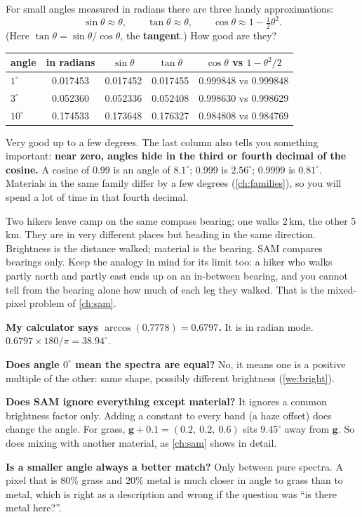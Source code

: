 \documentclass[11pt,a4paper,oneside,openany]{book}
\newcommand{\B}[1]{{\symbf{#1}}}
\newcommand{\B}[1]{{\bm{#1}}}
\newcommand{\vg}{\B{g}}
\begin{document}
For small angles measured in radians there are three handy approximations:
\[
  \sin\theta\approx\theta,\qquad \tan\theta\approx\theta,\qquad \cos\theta\approx1-\tfrac12\theta^2 .
\]
(Here $\tan\theta=\sin\theta/\cos\theta$, the \textbf{tangent}.) How good are they?

\begin{center}
\begin{tabular}{@{}lcccc@{}}
\toprule
angle & in radians & $\sin\theta$ & $\tan\theta$ & $\cos\theta$ vs $1-\theta^2/2$\\
\midrule
$1^\circ$ & 0.017453 & 0.017452 & 0.017455 & 0.999848 vs 0.999848\\
$3^\circ$ & 0.052360 & 0.052336 & 0.052408 & 0.998630 vs 0.998629\\
$10^\circ$ & 0.174533 & 0.173648 & 0.176327 & 0.984808 vs 0.984769\\
\bottomrule
\end{tabular}
\end{center}

Very good up to a few degrees. The last column also tells you something important: \textbf{near zero, angles hide in the
third or fourth decimal of the cosine.} A cosine of 0.99 is an angle of $8.1^\circ$; 0.999 is $2.56^\circ$; 0.9999 is
$0.81^\circ$. Materials in the same family differ by a few degrees (\cref{ch:families}), so you will spend a lot of time
in that fourth decimal.

\begin{analogy}
Two hikers leave camp on the same compass bearing; one walks 2\,km, the other 5\,km. They are in very different places
but heading in the same direction. Brightness is the distance walked; material is the bearing. SAM compares bearings
only. Keep the analogy in mind for its limit too: a hiker who walks partly north and partly east ends up on an
in-between bearing, and you cannot tell from the bearing alone how much of each leg they walked. That is the mixed-pixel
problem of \cref{ch:sam}.
\end{analogy}

\begin{confusions}
\textbf{My calculator says $\arccos(0.7778)=0.6797$.} It is in radian mode. $0.6797\times180/\pi=38.94^\circ$.

\textbf{Does angle $0^\circ$ mean the spectra are equal?} No, it means one is a positive multiple of the other: same
shape, possibly different brightness (\cref{we:bright}).

\textbf{Does SAM ignore everything except material?} It ignores a common brightness factor only. Adding a constant to
every band (a haze offset) does change the angle. For grass, $\vg+0.1=(0.2,\ 0.2,\ 0.6)$ sits $9.45^\circ$ away from
$\vg$. So does mixing with another material, as \cref{ch:sam} shows in detail.

\textbf{Is a smaller angle always a better match?} Only between pure spectra. A pixel that is 80\% grass and 20\% metal
is much closer in angle to grass than to metal, which is right as a description and wrong if the question was ``is
there metal here?''.
\end{confusions}
\end{document}
